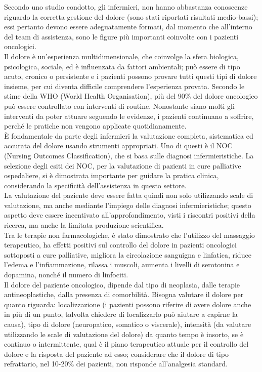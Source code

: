 Secondo uno studio condotto, gli infermieri, non hanno abbastanza conoscenze riguardo la corretta gestione del dolore
(sono stati riportati risultati medio-bassi)\cite{PAIN}; essi pertanto devono essere adeguatamente formati, 
dal momento che all’interno del team di assistenza, sono le figure più importanti coinvolte con i pazienti 
oncologici.\\
Il dolore è un’esperienza multidimensionale, che coinvolge la sfera biologica, psicologica, sociale, ed è 
influenzata da fattori ambientali; può essere di tipo acuto, cronico o persistente e i pazienti possono 
provare tutti questi tipi di dolore insieme, per cui diventa difficile comprendere l’esperienza provata\cite{PAINONS}. 
Secondo le stime  della WHO (World Health Organisation), più del 90\% del dolore oncologico può essere 
controllato con interventi di routine. Nonostante siano molti gli interventi da poter attuare seguendo le evidenze, 
i pazienti continuano a soffrire, perché le pratiche non vengono applicate quotidianamente\cite{PAINONS}.\\
È fondamentale da parte degli infermieri la valutazione completa, sistematica ed accurata del dolore usando 
strumenti appropriati. Uno di questi è il NOC (Nursing Outcomes Classification), che si basa sulle diagnosi infermieristiche. 
La selezione degli esiti dei NOC, per la valutazione di pazienti in cure palliative ospedaliere, si è dimostrata 
importante per guidare la pratica clinica, considerando la specificità dell’assistenza in questo settore\cite{painNOC}.\\
La valutazione del paziente deve essere fatta quindi non solo utilizzando scale di valutazione, ma anche 
mediante l’impiego delle diagnosi infermieristiche; questo aspetto deve essere 
incentivato all’approfondimento, visti i riscontri positivi della ricerca, ma anche la limitata 
produzione scientifica\cite{painNOC}.\\
Tra le terapie non farmacologiche, è stato dimostrato che l’utilizzo del massaggio terapeutico, ha effetti positivi sul 
controllo del dolore in pazienti oncologici sottoposti a cure palliative, migliora la circolazione sanguigna e linfatica, 
riduce l’edema e l’infiammazione, rilassa i muscoli, aumenta i livelli di 
serotonina e dopamina, nonché il numero di linfociti\cite{tpnonfarmacologiche}.\\

Il dolore del paziente oncologico, dipende dal tipo di neoplasia, dalle terapie antineoplastiche, 
dalla presenza di comorbilità. Bisogna valutare il dolore per quanto riguarda: 
localizzazione (i pazienti possono riferire di avere dolore anche in più di un punto, talvolta chiedere di 
localizzarlo può aiutare a capirne la causa), tipo di dolore (neuropatico, somatico o viscerale), intensità 
(da valutare utilizzando le scale di valutazione del dolore) da quanto tempo è insorto, 
se è continuo o intermittente, qual è il piano terapeutico attuale per il controllo del dolore e la risposta 
del paziente ad esso; considerare che il dolore di tipo refrattario, nel 10-20\% dei pazienti, 
non risponde all’analgesia standard\cite{CANCERPAINONS}.\\

